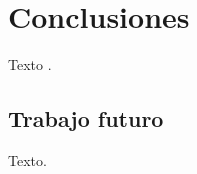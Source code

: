 \chapter{Conclusiones}
\label{cap:conclusiones}
Texto \citapendiente{}.

\section{Trabajo futuro}
Texto.
